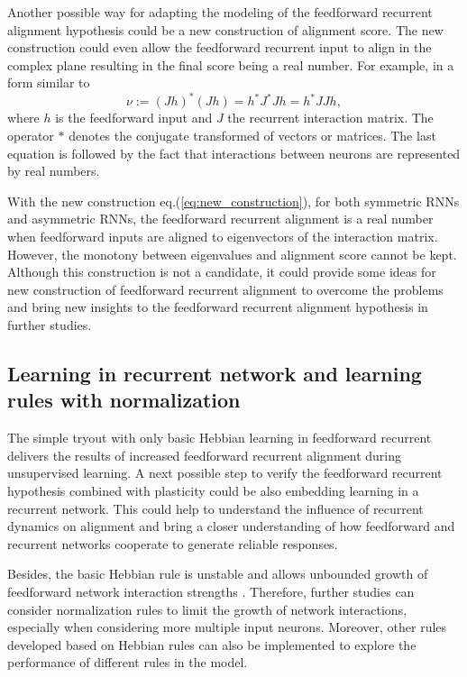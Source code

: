 \documentclass[11pt]{article}
\begin{document}
	Another possible way for adapting the modeling of the feedforward recurrent alignment hypothesis could be a new construction of alignment score. The new construction could even allow the feedforward recurrent input to align in the complex plane resulting in the final score being a real number. For example, in a form similar to
	\begin{equation} \label{eq:new_construction}
		\nu := (Jh)^*(Jh) = h^*J^*Jh = h^*JJh, 
	\end{equation} 
	where $h$ is the feedforward input and $J$ the recurrent interaction matrix. The operator $*$ denotes the conjugate transformed of vectors or matrices. The last equation is followed by the fact that interactions between neurons are represented by real numbers. 
	
	With the new construction eq.(\ref{eq:new_construction}), for both symmetric RNNs and asymmetric RNNs, the feedforward recurrent alignment is a real number when feedforward inputs are aligned to eigenvectors of the interaction matrix. However, the monotony between eigenvalues and alignment score cannot be kept. %
	Although this construction is not a candidate, it could provide some ideas for new construction of feedforward recurrent alignment to overcome the problems and bring new insights to the feedforward recurrent alignment hypothesis in further studies. 
	
	\subsection*{Learning in recurrent network and learning rules with normalization}
	The simple tryout with only basic Hebbian learning in feedforward recurrent delivers the results of increased feedforward recurrent alignment during unsupervised learning. A next possible step to verify the feedforward recurrent hypothesis combined with plasticity could be also embedding learning in a recurrent network. This could help to understand the influence of recurrent dynamics on alignment and bring a closer understanding of how feedforward and recurrent networks cooperate to generate reliable responses. 
	
	Besides, the basic Hebbian rule is unstable and allows unbounded growth of feedforward network interaction strengths \cite{dayan2005theoretical}. Therefore, further studies can consider normalization rules to limit the growth of network interactions, especially when considering more multiple input neurons. Moreover, other rules developed based on Hebbian rules can also be implemented to explore the performance of different rules in the model. 
	
\end{document}
